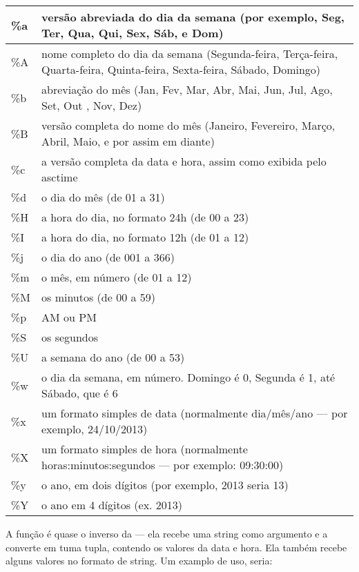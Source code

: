 \begin{center}
\begin{tabular}{|l|p{12cm}|}
\hline
\%a & versão abreviada do dia da semana (por exemplo, Seg, Ter, Qua, Qui, Sex, Sáb, e Dom) \\
\hline
\%A & nome completo do dia da semana (Segunda-feira, Terça-feira, Quarta-feira, Quinta-feira, Sexta-feira, Sábado, Domingo) \\
\hline
\%b & abreviação do mês (Jan, Fev, Mar, Abr, Mai, Jun, Jul, Ago, Set, Out , Nov, Dez) \\
\hline
\%B & versão completa do nome do mês (Janeiro, Fevereiro, Março, Abril, Maio, e por assim em diante) \\
\hline
\%c & a versão completa da data e hora, assim como exibida pelo asctime \\
\hline
\%d & o dia do mês (de 01 a 31) \\
\hline
\%H & a hora do dia, no formato 24h (de 00 a 23) \\
\hline
\%I & a hora do dia, no formato 12h (de 01 a 12) \\
\hline
\%j & o dia do ano (de 001 a 366) \\
\hline
\%m & o mês, em número (de 01 a 12) \\
\hline
\%M & os minutos (de 00 a 59) \\
\hline
\%p & AM ou PM \\
\hline
\%S & os segundos \\
\hline
\%U & a semana do ano (de 00 a 53) \\
\hline
\%w & o dia da semana, em número.  Domingo é 0, Segunda é 1, até Sábado, que é 6 \\
\hline
\%x & um formato simples de data (normalmente dia/mês/ano --- por exemplo, 24/10/2013) \\
\hline
\%X & um formato simples de hora (normalmente horas:minutos:segundos --- por exemplo: 09:30:00) \\
\hline
\%y & o ano, em dois dígitos (por exemplo, 2013 seria 13) \\
\hline
\%Y & o ano em 4 dígitos (ex. 2013) \\
\hline
\end{tabular}
\end{center}

A função  é quase o inverso da  --- ela recebe uma string como argumento e a converte em tuma tupla, contendo os valores da data e hora. Ela também recebe alguns valores no formato de string. Um examplo de uso, seria:

